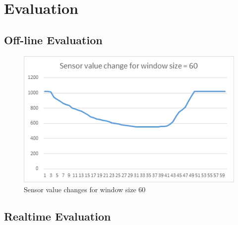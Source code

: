 \section{Evaluation}

\subsection{Off-line Evaluation}

\begin{figure}[h]
\includegraphics[width=.45\textwidth]{window_60.png}
\caption{Sensor value changes for window size 60}
\label{fig:window_60}
\end{figure}


\subsection{Realtime Evaluation}
